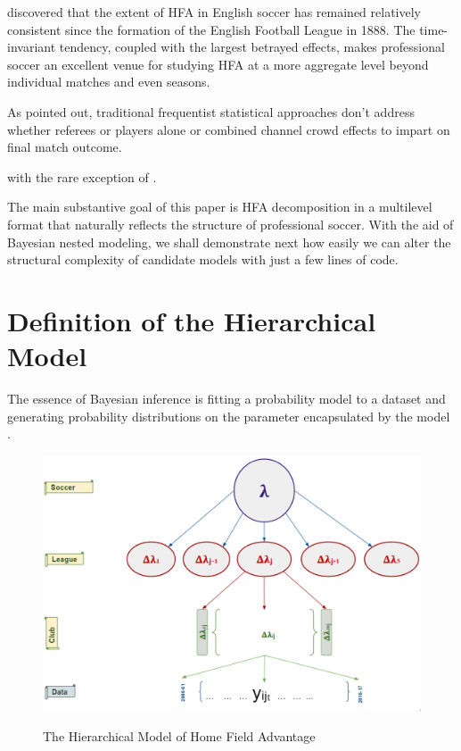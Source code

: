 \documentclass[USenglish]{article}
\begin{document}
\cite{Pollard1986} discovered that the extent of HFA in English soccer has remained relatively consistent since the formation of the English Football League in 1888. The time-invariant tendency, coupled with the largest betrayed effects, makes professional soccer an excellent venue for studying HFA at a more aggregate level beyond individual matches and even seasons. 



As \cite{Boyko2007} pointed out, traditional frequentist statistical approaches don't address whether referees or players alone or combined channel crowd effects to impart on final match outcome.

with the rare exception of \cite{Gajewski2006}.

The main substantive goal of this paper is HFA decomposition in a multilevel format that naturally reflects the structure of professional soccer. With the aid of Bayesian nested modeling, we shall demonstrate next how easily we can alter the structural complexity of candidate models with just a few lines of code.

\section{Definition of the Hierarchical Model} 

The essence of Bayesian inference is fitting a probability model to a dataset and generating probability distributions on the parameter encapsulated by the model \citep{Gelman2014}.

\begin{figure}
\caption{The Hierarchical Model of Home Field Advantage }
{\includegraphics[width=1.0\linewidth]{HFA_33}}
\label{fig33}
\end{figure} 
\end{document}
